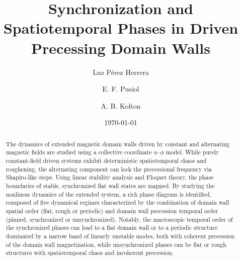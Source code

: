 \documentclass[prb,aps,twocolumn,superscriptaddress,floatfix]{revtex4-1}
\begin{document}

\title{Synchronization and Spatiotemporal Phases in Driven Precessing Domain Walls}
 
\author{Luz Pérez Herrera}

\author{E. F. Pusiol}

\author{A. B. Kolton}




\date{\today}

\begin{abstract}
The dynamics of extended magnetic domain walls driven by constant and alternating magnetic fields are studied using a collective coordinate $u$--$\phi$ model. While purely constant-field driven systems exhibit deterministic spatiotemporal chaos and roughening, the alternating component can lock the precessional frequency via Shapiro-like steps. Using linear stability analysis and Floquet theory, the phase boundaries of stable, synchronized flat wall states are mapped. By studying the nonlinear dynamics of the extended system, a rich phase diagram is identified, 
composed of five dynamical regimes characterized by the combination of domain wall spatial order (flat, rough or periodic) and  domain wall precession temporal order (pinned, synchronized or unsynchronized).
Notably, the macroscopic temporal order of the synchronized phases can lead to a flat domain wall or to a periodic structure dominated by a narrow band of linearly unstable modes, both with coherent precession of the domain wall magnetization, while unsynchronized phases can be flat or rough structures with spatiotemporal chaos and incoherent precession.
\end{abstract}
\end{document}
